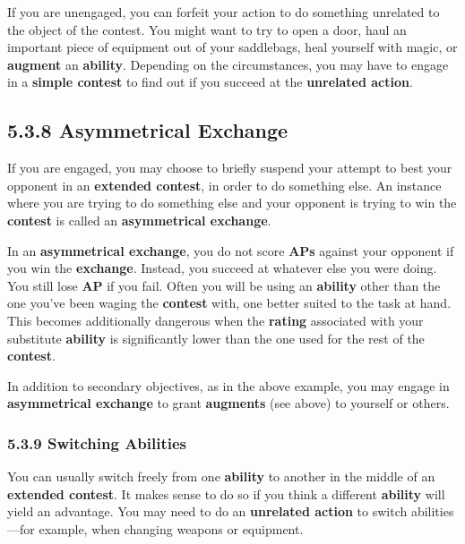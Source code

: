 \documentclass[
]{article}
\begin{document}
If you are unengaged, you can forfeit your action to do something
unrelated to the object of the contest. You might want to try to open a
door, haul an important piece of equipment out of your saddlebags, heal
yourself with magic, or \textbf{augment} an \textbf{ability}. Depending
on the circumstances, you may have to engage in a \textbf{simple
contest} to find out if you succeed at the \textbf{unrelated action}.

\hypertarget{asymmetrical-exchange}{%
\subsection{5.3.8 Asymmetrical Exchange}\label{asymmetrical-exchange}}

If you are engaged, you may choose to briefly suspend your attempt to
best your opponent in an \textbf{extended contest}, in order to do
something else. An instance where you are trying to do something else
and your opponent is trying to win the \textbf{contest} is called an
\textbf{asymmetrical exchange}.

In an \textbf{asymmetrical exchange}, you do not score \textbf{APs}
against your opponent if you win the \textbf{exchange}. Instead, you
succeed at whatever else you were doing. You still lose \textbf{AP} if
you fail. Often you will be using an \textbf{ability} other than the one
you've been waging the \textbf{contest} with, one better suited to the
task at hand. This becomes additionally dangerous when the
\textbf{rating} associated with your substitute \textbf{ability} is
significantly lower than the one used for the rest of the
\textbf{contest}.

In addition to secondary objectives, as in the above example, you may
engage in \textbf{asymmetrical exchange} to grant \textbf{augments} (see
above) to yourself or others.

\hypertarget{switching-abilities-1}{%
\subsubsection{5.3.9 Switching Abilities}\label{switching-abilities-1}}

You can usually switch freely from one \textbf{ability} to another in
the middle of an \textbf{extended contest}. It makes sense to do so if
you think a different \textbf{ability} will yield an advantage. You may
need to do an \textbf{unrelated action} to switch abilities---for
example, when changing weapons or equipment.
\end{document}
